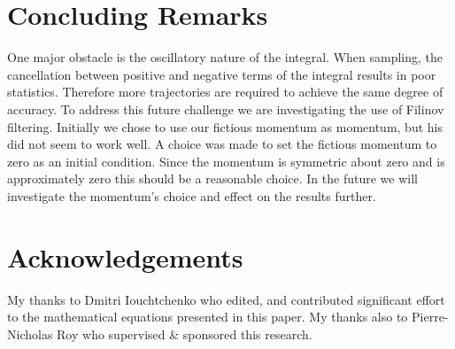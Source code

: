 \documentclass[12pt,letterpaper,oneside,final,titlepage]{article}               %
\numberwithin{equation}{section} %
\begin{document}
\section{Concluding Remarks}
One major obstacle is the oscillatory nature of the integral. When sampling, the cancellation between positive and negative terms of the integral results in poor statistics. Therefore more trajectories are required to achieve the same degree of accuracy. To address this future challenge we are investigating the use of Filinov filtering.
Initially we chose to use our fictious momentum as momentum, but his did not seem to work well.
A choice was made to set the fictious momentum to zero as an initial condition. 
Since the momentum is symmetric about zero and is approximately zero this should be a reasonable choice.
In the future we will investigate the momentum's choice and effect on the results further.

\section{Acknowledgements}
My thanks to Dmitri Iouchtchenko who edited, and contributed significant effort to the mathematical equations presented in this paper. 
My thanks also to Pierre-Nicholas Roy who supervised \& sponsored this research.

\renewcommand*{\bibfont}{\scriptsize}
\printbibliography
\end{document}

